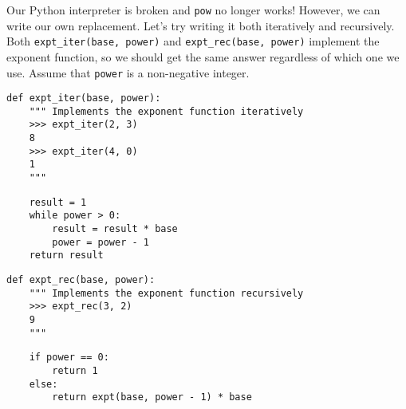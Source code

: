 \question Our Python interpreter is broken and {\tt pow} no longer works!
However, we can write our own replacement. Let's try writing it both
iteratively and recursively. Both {\tt expt\_iter(base, power)} and 
{\tt expt\_rec(base, power)} implement the exponent function, so we should get
the same answer regardless of which one we use. Assume that {\tt power} is a
non-negative integer.

\begin{lstlisting}
def expt_iter(base, power):
    """ Implements the exponent function iteratively
    >>> expt_iter(2, 3)
    8
    >>> expt_iter(4, 0)
    1
    """
\end{lstlisting}
\begin{solution}[1.8in]
\begin{lstlisting}
    result = 1
    while power > 0:
        result = result * base
        power = power - 1
    return result
\end{lstlisting}
\end{solution}

\begin{lstlisting}
def expt_rec(base, power):
    """ Implements the exponent function recursively
    >>> expt_rec(3, 2)
    9
    """
\end{lstlisting}
\begin{solution}[1.8in]
\begin{lstlisting}
    if power == 0:
        return 1
    else:
        return expt(base, power - 1) * base
\end{lstlisting}
\end{solution}
